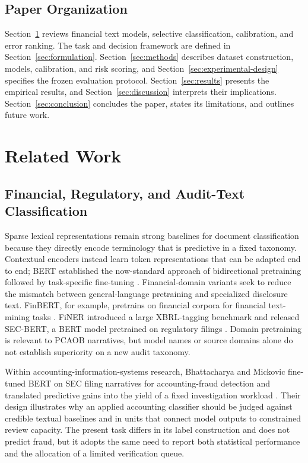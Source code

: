 \documentclass[11pt]{article}
\begin{document}
\subsection{Paper Organization}

Section~\ref{sec:related-work} reviews financial text models, selective
classification, calibration, and error ranking. The task and decision
framework are defined in Section~\ref{sec:formulation}. Section~\ref{sec:methods}
describes dataset construction, models, calibration, and risk scoring, and
Section~\ref{sec:experimental-design} specifies the frozen evaluation protocol.
Section~\ref{sec:results} presents the empirical results, and
Section~\ref{sec:discussion} interprets their implications. Section~\ref{sec:conclusion}
concludes the paper, states its limitations, and outlines future work.

\section{Related Work}
\label{sec:related-work}

\subsection{Financial, Regulatory, and Audit-Text Classification}

Sparse lexical representations remain strong baselines for document
classification because they directly encode terminology that is predictive in a
fixed taxonomy. Contextual encoders instead learn token representations that can
be adapted end to end; BERT established the now-standard approach of
bidirectional pretraining followed by task-specific fine-tuning
\cite{devlin2019bert}. Financial-domain variants seek to reduce the mismatch
between general-language pretraining and specialized disclosure text. FinBERT,
for example, pretrains on financial corpora for financial text-mining tasks
\cite{liu2020finbert}. FiNER introduced a large XBRL-tagging benchmark and
released SEC-BERT, a BERT model pretrained on regulatory filings
\cite{loukas2022finer}. Domain pretraining is relevant to PCAOB narratives, but
model names or source domains alone do not establish superiority on a new audit
taxonomy.

Within accounting-information-systems research, Bhattacharya and Mickovic
fine-tuned BERT on SEC filing narratives for accounting-fraud detection and
translated predictive gains into the yield of a fixed investigation workload
\cite{bhattacharya2024fraud}. Their design illustrates why an applied accounting
classifier should be judged against credible textual baselines and in units that
connect model outputs to constrained review capacity. The present task differs in
its label construction and does not predict fraud, but it adopts the same need to
report both statistical performance and the allocation of a limited verification
queue.
\end{document}
